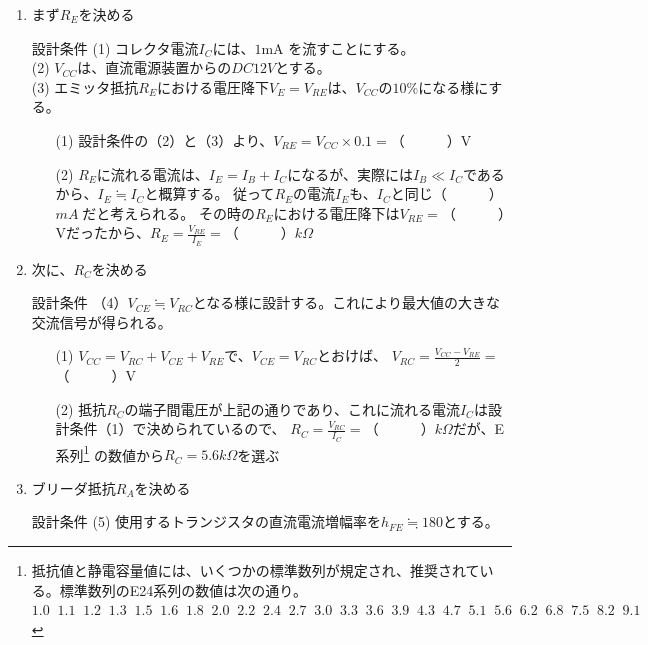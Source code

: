 \documentclass[uplatex,a4paper,11pt,oneside,openany]{jsbook}
\begin{document}
\begin{enumerate}
	\item まず$R_E$を決める\\
	\begin{itembox}[l]{設計条件}
		(1) コレクタ電流$I_C$には、$1$mA を流すことにする。\\
		(2) $V_{CC}$は、直流電源装置からの$DC12V$とする。\\
		(3) エミッタ抵抗$R_E$における電圧降下$V_E=V_{RE}$は、$V_{CC}$の$10\%$になる様にする。
	\end{itembox}
	\begin{enumerate}
		\item[(1)] 設計条件の（2）と（3）より、$V_{RE}=V_{CC}\times 0.1=$（　　　）V
		\item[(2)] $R_E$に流れる電流は、$I_E=I_B+I_C$になるが、実際には$I_B\ll I_C$であるから、$I_E\fallingdotseq I_C$と概算する。
		従って$R_E$の電流$I_E$も、$I_C$と同じ（　　　）$mA\;$だと考えられる。
		その時の$R_E$における電圧降下は$V_{RE}=$（　　　）Vだったから、$R_E=\displaystyle\frac{V_{RE}}{I_E}=$（　　　）$k\Omega$
	\end{enumerate}
	\vfill
	\item 次に、$R_C$を決める\\
	\begin{itembox}[l]{設計条件}
		（4）$V_{CE}\fallingdotseq V_{RC}$となる様に設計する。これにより最大値の大きな交流信号が得られる。
	\end{itembox}
	\begin{enumerate}
		\item[(1)] $V_{CC}=V_{RC}+V_{CE}+V_{RE}$で、$V_{CE}=V_{RC}$とおけば、
		$V_{RC}=\displaystyle\frac{V_{CC}-V_{RE}}{2}=$（　　　）V
		\item[(2)] 抵抗$R_C$の端子間電圧が上記の通りであり、これに流れる電流$I_C$は設計条件（1）で決められているので、
		$R_C=\displaystyle\frac{V_{RC}}{I_C}=$（　　　）$k\Omega$だが、E系列\footnote{抵抗値と静電容量値には、いくつかの標準数列が規定され、推奨されている。標準数列のE24系列の数値は次の通り。\\
			$1.0\;\;1.1\;\;1.2\;\;1.3\;\;1.5\;\;1.6\;\;1.8\;\;2.0\;\;2.2\;\;2.4\;\;2.7\;\;3.0\;\;3.3\;\;3.6\;\;3.9\;\;4.3\;\;4.7\;\;5.1\;\;5.6\;\;6.2\;\;6.8\;\;7.5\;\;8.2\;\;9.1$}
		の数値から$R_C=5.6k\Omega$を選ぶ
	\end{enumerate}
	\vfill
	\item ブリーダ抵抗$R_A$を決める\\
	\begin{itembox}[l]{設計条件}
		(5) 使用するトランジスタの直流電流増幅率を$h_{FE}\fallingdotseq 180$とする。\\

\end{itembox}
\end{enumerate}
\end{document}
